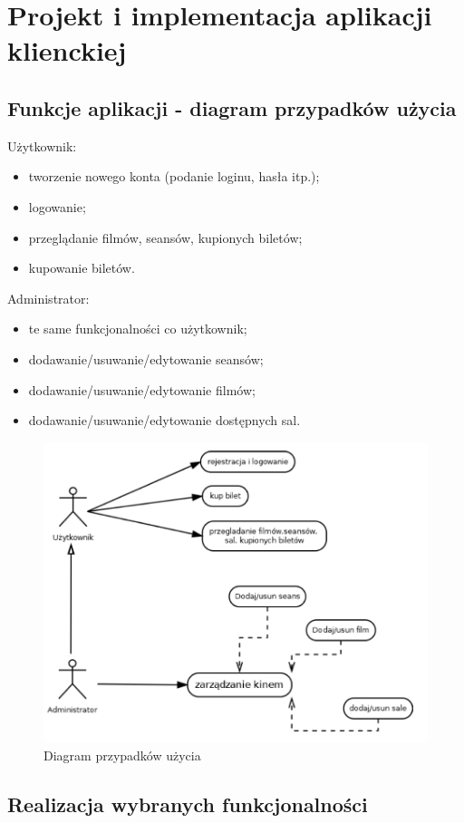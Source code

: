 \chapter{Projekt i implementacja aplikacji klienckiej}

\section{Funkcje aplikacji - diagram przypadków użycia}

Użytkownik:
\begin{itemize}
	\item tworzenie nowego konta (podanie loginu, hasła itp.);
	\item logowanie;
	\item przeglądanie filmów, seansów, kupionych biletów;
	\item kupowanie biletów.
\end{itemize}
\vspace*{0.5em}
Administrator:
\begin{itemize}
	\item te same funkcjonalności co użytkownik;
	\item dodawanie/usuwanie/edytowanie seansów;
	\item dodawanie/usuwanie/edytowanie filmów;
	\item dodawanie/usuwanie/edytowanie dostępnych sal.
\end{itemize}

\begin{figure} [H]
	\centering
	\includegraphics[width=0.6\linewidth]{rozdzial05/diagram.png}
	\caption{Diagram przypadków użycia}
	\label{fig:schem}
\end{figure}

\section{Realizacja wybranych funkcjonalności}